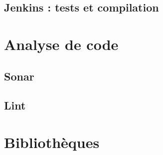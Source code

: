 \subsection{Jenkins : tests et compilation}

\section{Analyse de code}
\subsection{Sonar}
\subsection{Lint}

\section{Bibliothèques}
